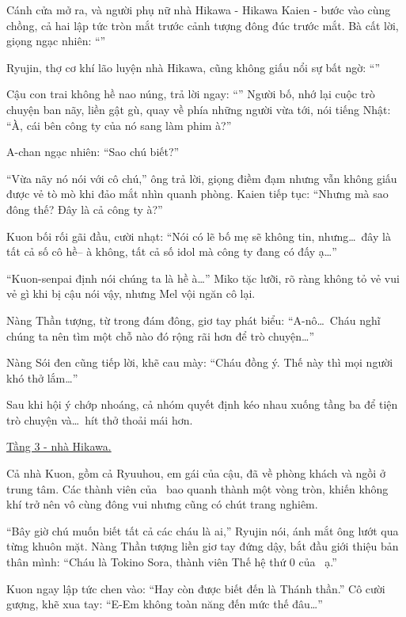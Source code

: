 \documentclass[../main.tex]{subfiles}
\begin{document}
Cánh cửa mở ra, và người phụ nữ nhà Hikawa - Hikawa Kaien - bước vào cùng chồng, cả hai lập tức tròn mắt trước cảnh tượng đông đúc trước mắt. Bà cất lời, giọng ngạc nhiên: ``''

Ryujin, thợ cơ khí lão luyện nhà Hikawa, cũng không giấu nổi sự bất ngờ: ``''

Cậu con trai không hề nao núng, trả lời ngay: ``'' Người bố, nhớ lại cuộc trò chuyện ban nãy, liền gật gù, quay về phía những người vừa tới, nói tiếng Nhật: ``À, cái bên công ty của nó sang làm phim à?''

A-chan ngạc nhiên: ``Sao chú biết?''

``Vừa nãy nó nói với cô chú,'' ông trả lời, giọng điềm đạm nhưng vẫn không giấu được vẻ tò mò khi đảo mắt nhìn quanh phòng. Kaien tiếp tục: ``Nhưng mà sao đông thế? Đây là cả công ty à?''

Kuon bối rối gãi đầu, cười nhạt: ``Nói có lẽ bố mẹ sẽ không tin, nhưng\dots\ đây là tất cả số cô hề-- à không, tất cả số idol mà công ty đang có đấy ạ\dots''

``Kuon-senpai định nói chúng ta là hề à\dots'' Miko tặc lưỡi, rõ ràng không tỏ vẻ vui vẻ gì khi bị cậu nói vậy, nhưng Mel vội ngăn cô lại.

Nàng Thần tượng, từ trong đám đông, giơ tay phát biểu: ``A-nô\dots\ Cháu nghĩ chúng ta nên tìm một chỗ nào đó rộng rãi hơn để trò chuyện\dots''

Nàng Sói đen cũng tiếp lời, khẽ cau mày: ``Cháu đồng ý. Thế này thì mọi người khó thở lắm\dots''

Sau khi hội ý chớp nhoáng, cả nhóm quyết định kéo nhau xuống tầng ba để tiện trò chuyện và\dots\ hít thở thoải mái hơn.

\begin{center}
    \uline{Tầng 3 - nhà Hikawa.}
\end{center}

Cả nhà Kuon, gồm cả Ryuuhou, em gái của cậu, đã về phòng khách và ngồi ở trung tâm. Các thành viên của \hll\ bao quanh thành một vòng tròn, khiến không khí trở nên vô cùng đông vui nhưng cũng có chút trang nghiêm.

``Bây giờ chú muốn biết tất cả các cháu là ai,'' Ryujin nói, ánh mắt ông lướt qua từng khuôn mặt. Nàng Thần tượng liền giơ tay đứng dậy, bắt đầu giới thiệu bản thân mình: ``Cháu là Tokino Sora, thành viên Thế hệ thứ 0 của \hll\ ạ.''

Kuon ngay lập tức chen vào: ``Hay còn được biết đến là Thánh thần.'' Cô cười gượng, khẽ xua tay: ``E-Em không toàn năng đến mức thế đâu\dots''
\end{document}
